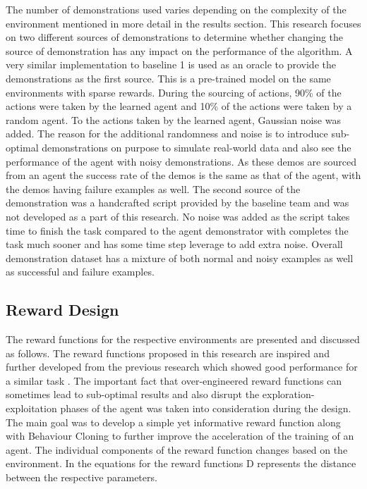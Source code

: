The number of demonstrations used varies depending on the complexity of the environment mentioned in more detail in the results section. This research focuses on two different sources of demonstrations to determine whether changing the source of demonstration has any impact on the performance of the algorithm. A very similar implementation to baseline 1 is used as an oracle \cite{AgentDemonstrations} to provide the demonstrations as the first source. This is a pre-trained model on the same environments with sparse rewards. During the sourcing of actions, 90\% of the actions were taken by the learned agent and 10\% of the actions were taken by a random agent. To the actions taken by the learned agent, Gaussian noise was added. The reason for the additional randomness and noise is to introduce sub-optimal demonstrations on purpose to simulate real-world data and also see the performance of the agent with noisy demonstrations. As these demos are sourced from an agent the success rate of the demos is the same as that of the agent, with the demos having failure examples as well. The second source of the demonstration was a handcrafted script \cite{stable-baselines} provided by the baseline team and was not developed as a part of this research. No noise was added as the script takes time to finish the task compared to the agent demonstrator with completes the task much sooner and has some time step leverage to add extra noise. Overall demonstration dataset has a mixture of both normal and noisy examples as well as successful and failure examples. \\

\subsection{Reward Design}

The reward functions for the respective environments are presented and discussed as follows. The reward functions proposed in this research are inspired and further developed from the previous research which showed good performance for a similar task \cite{nagpal2020reward}. The important fact that over-engineered reward functions can sometimes lead to sub-optimal results and also disrupt the exploration-exploitation phases of the agent was taken into consideration during the design. The main goal was to develop a simple yet informative reward function along with Behaviour Cloning to further improve the acceleration of the training of an agent. The individual components of the reward function changes based on the environment. In the equations for the reward functions D represents the distance between the respective parameters. \\

